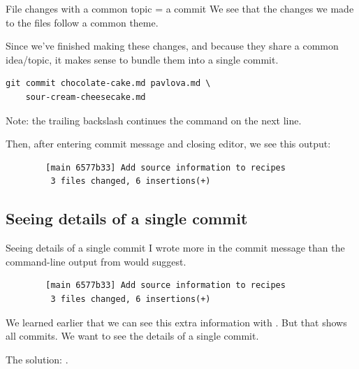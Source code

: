 \documentclass{git_course}
\begin{document}
\begin{frame}[fragile]{File changes with a common topic = a commit}
    We see that the changes we made to the files follow a common theme.

    Since we've finished making these changes, and because they share a
    common idea/topic, it makes sense to bundle them into a single commit.

    \begin{verbatim}
git commit chocolate-cake.md pavlova.md \
    sour-cream-cheesecake.md
    \end{verbatim}
    Note: the trailing backslash continues the command on the next line.

    Then, after entering commit message and closing editor, we see this
    output:
    \begin{verbatim}
        [main 6577b33] Add source information to recipes
         3 files changed, 6 insertions(+)
    \end{verbatim}
\end{frame}

\subsection{Seeing details of a single commit}

\begin{frame}[fragile]{Seeing details of a single commit}
    I wrote more in the commit message than the command-line output from
    \code{git commit} would suggest.

    \begin{verbatim}
        [main 6577b33] Add source information to recipes
         3 files changed, 6 insertions(+)
    \end{verbatim}

    We learned earlier that we can see this extra information with \code{git
    log}.  But that shows all commits.  We want to see the details of a
    single commit.

    The solution: .
\end{frame}
\end{document}
